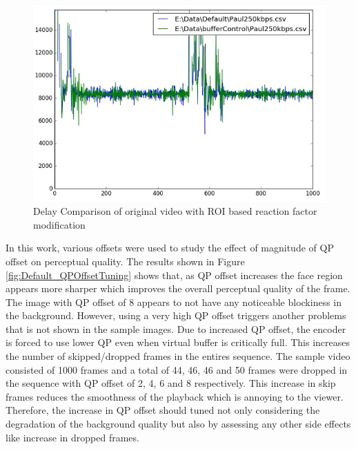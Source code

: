 \documentclass[11pt]{article} %
\begin{document}
\begin{figure}[!h]
    \centering
    \includegraphics[scale=0.75]{BufferControl/Paul250kbps_Buffer_Control_Delay}
    \caption{Delay Comparison of original video with ROI based reaction factor modification}
    \label{fig:DelayDefault_BufferControltCompare}
\end{figure}

In this work, various offsets were used to study the effect of magnitude of QP offset on perceptual quality. The results shown in Figure \ref{fig:Default_QPOffsetTuning} shows that, as QP offset increases the face region appears more sharper which improves the overall perceptual quality of the frame. The image with QP offset of 8 appears to not have any noticeable blockiness in the background. However, using a very high QP offset triggers another problems that is not shown in the sample images. Due to increased QP offset, the encoder is forced to use lower QP even when virtual buffer is critically full. This increases the number of skipped/dropped frames in the entires sequence. The sample video consisted of 1000 frames and a total of 44, 46, 46 and 50 frames were dropped in the sequence with QP offset of 2, 4, 6 and 8 respectively. This increase in skip frames reduces the smoothness of the playback which is annoying to the viewer. Therefore, the increase in QP offset should tuned not only considering the degradation of the background quality but also by assessing any other side effects like increase in dropped frames.
%
\end{document}
